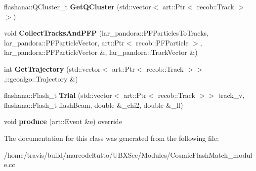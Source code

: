 \begin{DoxyCompactItemize}
\item 
\hypertarget{classCosmicFlashMatch_a04fb198244e86fbd2cb6c6f6a0ef1363}{flashana\-::\-Q\-Cluster\-\_\-t {\bfseries \-Get\-Q\-Cluster} (std\-::vector$<$ art\-::\-Ptr$<$ recob\-::\-Track $>$$>$)}\label{classCosmicFlashMatch_a04fb198244e86fbd2cb6c6f6a0ef1363}

\item 
\hypertarget{classCosmicFlashMatch_a29112dc33d6ce0be700ad02f967d709d}{void {\bfseries \-Collect\-Tracks\-And\-P\-F\-P} (lar\-\_\-pandora\-::\-P\-F\-Particles\-To\-Tracks, lar\-\_\-pandora\-::\-P\-F\-Particle\-Vector, art\-::\-Ptr$<$ recob\-::\-P\-F\-Particle $>$, lar\-\_\-pandora\-::\-P\-F\-Particle\-Vector \&, lar\-\_\-pandora\-::\-Track\-Vector \&)}\label{classCosmicFlashMatch_a29112dc33d6ce0be700ad02f967d709d}

\item 
\hypertarget{classCosmicFlashMatch_a3208db108dea02a5c7113205137ea363}{int {\bfseries \-Get\-Trajectory} (std\-::vector$<$ art\-::\-Ptr$<$ recob\-::\-Track $>$$>$,\-::geoalgo\-::\-Trajectory \&)}\label{classCosmicFlashMatch_a3208db108dea02a5c7113205137ea363}

\item 
\hypertarget{classCosmicFlashMatch_ac329a3c7f942e9c7d26ecee88f91c8ea}{flashana\-::\-Flash\-\_\-t {\bfseries \-Trial} (std\-::vector$<$ art\-::\-Ptr$<$ recob\-::\-Track $>$$>$ track\-\_\-v, flashana\-::\-Flash\-\_\-t flash\-Beam, double \&\-\_\-chi2, double \&\-\_\-ll)}\label{classCosmicFlashMatch_ac329a3c7f942e9c7d26ecee88f91c8ea}

\item 
\hypertarget{classCosmicFlashMatch_aebcbe54d9d6fc9e14b98a008d7776308}{void {\bfseries produce} (art\-::\-Event \&e) override}\label{classCosmicFlashMatch_aebcbe54d9d6fc9e14b98a008d7776308}

\end{DoxyCompactItemize}


\-The documentation for this class was generated from the following file\-:\begin{DoxyCompactItemize}
\item 
/home/travis/build/marcodeltutto/\-U\-B\-X\-Sec/\-Modules/\-Cosmic\-Flash\-Match\-\_\-module.\-cc\end{DoxyCompactItemize}
